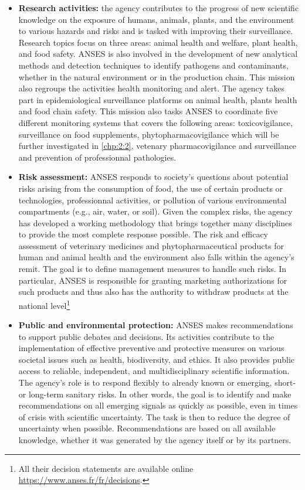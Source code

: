 \begin{itemize}
\item \textbf{Research activities:} the agency contributes to the progress of new scientific knowledge on the exposure of humans, animals, plants, and the environment to various hazards and risks and is tasked with improving their surveillance. Research topics focus on three areas: animal health and welfare, plant health, and food safety. ANSES is also involved in the development of new analytical methods and detection techniques to identify pathogens and contaminants, whether in the natural environment or in the production chain. This mission also regroups the activities health monitoring and alert. The agency takes part in epidemiological surveillance platforms on animal health, plants health and food chain safety. This mission also tasks ANSES to coordinate five different monitoring systems that covers the following areas: toxicovigilance, surveillance on food supplements, phytopharmacovigilance which will be further investigated in \ref{chp:2:2}, vetenary pharmacovigilance and surveillance and prevention of professionnal pathologies.      
\item \textbf{Risk assessment:} ANSES responds to society's questions about potential risks arising from the consumption of food, the use of certain products or technologies, professionnal activities, or pollution of various environmental compartments (e.g., air, water, or soil). Given the complex risks, the agency has developed a working methodology that brings together many disciplines to provide the most complete response possible. The risk and efficacy assessment of veterinary medicines and phytopharmaceutical products for human and animal health and the environment also falls within the agency's remit. The goal is to define management measures to handle such risks. In particular, ANSES is responsible for granting marketing authorizations for such products and thus also has the authority to withdraw products at the national level\footnote{All their decision statements are available online \url{https://www.anses.fr/fr/decisions}.}
\item \textbf{Public and environmental protection:} ANSES makes recommendations to support public debates and decisions. Its activities contribute to the implementation of effective preventive and protective measures on various societal issues such as health, biodiversity, and ethics. It also provides public access to reliable, independent, and multidisciplinary scientific information. The agency's role is to respond flexibly to already known or emerging, short- or long-term sanitary risks. In other words, the goal is to identify and make recommendations on all emerging signals as quickly as possible, even in times of crisis with scientific uncertainty. The task is then to reduce the degree of uncertainty when possible. Recommendations are based on all available knowledge, whether it was generated by the agency itself or by its partners. 
\end{itemize}


